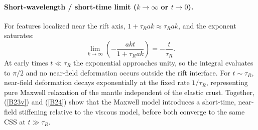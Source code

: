 \documentclass{article}
\begin{document}
\paragraph{Short-wavelength / short-time limit ($k\to\infty$ or $t\to 0$).}
For features localized near the rift axis, $1+\tau_R ak\approx\tau_R ak$,
and the exponent saturates:
\begin{equation}
\lim_{k\to\infty}\left(-\frac{akt}{1+\tau_R ak}\right) = -\frac{t}{\tau_R}.
\label{B24}
\end{equation}
At early times $t\ll\tau_R$ the exponential approaches unity, so the integral
evaluates to $\pi/2$ and no near-field deformation occurs outside the rift
interface. For $t\sim\tau_R$, near-field deformation decays exponentially at
the fixed rate $1/\tau_R$, representing pure Maxwell relaxation of the mantle
independent of the elastic crust. Together, (\ref{B23v}) and (\ref{B24})
show that the Maxwell model introduces a short-time, near-field stiffening
relative to the viscous model, before both converge to the same CSS at
$t\gg\tau_R$.


\end{document}
